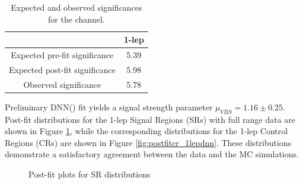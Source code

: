 \begin{table}[h]
  \centering
  \begin{tabular}{|c|c|}
    \hline
           & 1-lep \\
    \hline
    Expected pre-fit significance & 5.39 \\
    \hline
    Expected post-fit significance & 5.98 \\
    \hline
    Observed significance & 5.78 \\
    \hline
  \end{tabular}
  \caption{Expected and observed significances for the \olep channel.}
  \label{tab:significance_1lepdnn}
\end{table}

Preliminary DNN(\olep) fit yields a signal strength parameter $\mu_{VBS} = 1.16 \pm 0.25$. 
Post-fit distributions for the 1-lep Signal Regions (SRs) with full range data are shown in Figure \ref{fig:postfitsr_1lepdnn}, while the corresponding distributions for the 1-lep Control Regions (CRs) are shown in Figure \ref{fig:postfitcr_1lepdnn}.
These distributions demonstrate a satisfactory agreement between the data and the MC simulations.

\begin{figure}[h]
  \centering
  \caption{Post-fit plots for SR distributions}
  \label{fig:postfitsr_1lepdnn}
\end{figure}

